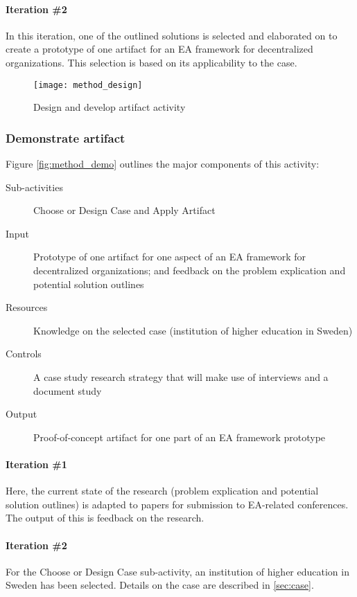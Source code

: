 \paragraph{Iteration \#2}

In this iteration, one of the outlined solutions is selected and elaborated on to create a prototype of one artifact for an EA framework for decentralized organizations. This selection is based on its applicability to the case. 

\begin{figure}
\texttt{[image: method\_design]}
\caption{Design and develop artifact activity}
\label{fig:method_design}
\end{figure}
  
\subsubsection*{Demonstrate artifact}

Figure \ref{fig:method_demo} outlines the major components of this activity:
\begin{description}
  \item[Sub-activities]  Choose or Design Case and Apply Artifact~\cite[Ch. 8]{johannessonPerjons2012}
  \item[Input] Prototype of one artifact for one aspect of an EA framework for decentralized organizations; and feedback on the problem explication and potential solution outlines
  \item[Resources]  Knowledge on the selected case (institution of higher education in Sweden)
  \item[Controls]  A case study research strategy that will make use of interviews and a document study
  \item[Output] Proof-of-concept artifact for one part of an EA framework prototype
\end{description}

\paragraph{Iteration \#1}

Here, the current state of the research (problem explication and potential solution outlines) is adapted to papers for submission to EA-related conferences. The output of this is feedback on the research.

\paragraph{Iteration \#2}
For the Choose or Design Case sub-activity, an institution of higher education in Sweden has been selected. Details on the case are described in \ref{sec:case}.

